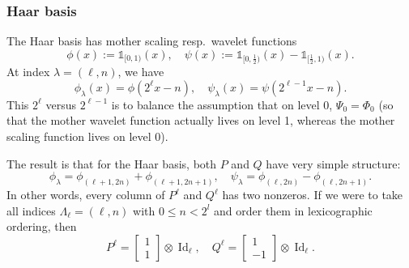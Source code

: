 \documentclass[11pt,a4paper]{amsart}
\theoremstyle{definition}
\DeclareMathOperator{\Id}{Id}
\newcommand{\bbone}{\mathds{1}}
\begin{document}
\subsubsection*{Haar basis}
The Haar basis has mother scaling resp.~wavelet functions
\[
  \phi(x) := \bbone_{[0,1)}(x), \quad \psi(x) := \bbone_{[0,\frac{1}{2})}(x) - \bbone_{[\frac{1}{2},1)}(x).
\]
At index $\lambda = (\ell, n)$, we have
\[
  \phi_\lambda(x) = \phi(2^\ell x - n), \quad \psi_\lambda(x) = \psi(2^{\ell-1}x - n).
\]
This $2^\ell$ versus $2^{\ell-1}$ is to balance the assumption that on level 0,
$\Psi_0 = \Phi_0$ (so that the mother wavelet function actually lives on level 1,
whereas the mother scaling function lives on level 0).

The result is that for the Haar basis, both $P$ and $Q$ have very simple structure:
\[
  \phi_\lambda = \phi_{(\ell+1, 2n)} + \phi_{(\ell+1, 2n+1)}, \quad
  \psi_\lambda = \phi_{(\ell, 2n)} - \phi_{(\ell, 2n+1)}.
\]
In other words, every column of $P^\ell$ and $Q^\ell$ has two nonzeros. If we
were to take all indices $\Lambda_\ell = (\ell, n)$ with $0 \leq n < 2^l$ and
order them in lexicographic ordering, then
\[
  P^{\ell} = \begin{bmatrix}1 \\ 1\end{bmatrix} \otimes \Id_{\ell}, \quad Q^{\ell} = \begin{bmatrix}1 \\ -1\end{bmatrix} \otimes \Id_{\ell}.
\]
\end{document}
